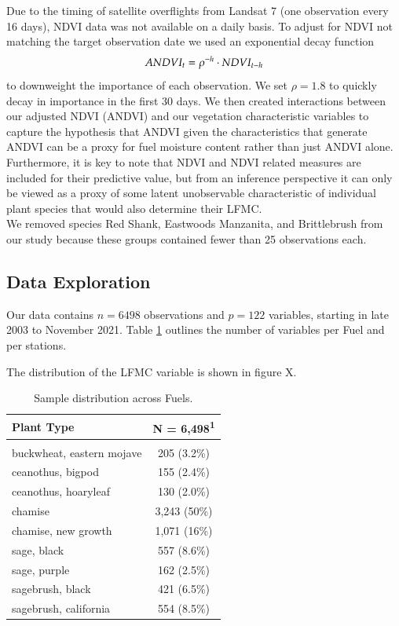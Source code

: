 \documentclass[twocolumn,10pt]{article}
\begin{document}
Due to the timing of satellite overflights from Landsat 7 (one observation every 16 days), NDVI data was not available on a daily basis. To adjust for NDVI not matching the target observation date we used an exponential decay function
\begin{equation}
    \label{eqn:downweight}
    ANDVI_{t} = \rho^{-h} \cdot NDVI_{t-h}\\
\end{equation}
to downweight the importance of each observation. We set $\rho=1.8$ to quickly decay in importance in the first 30 days. We then created interactions between our adjusted NDVI (ANDVI) and our vegetation characteristic variables to capture the hypothesis that ANDVI given the characteristics that generate ANDVI can be a proxy for fuel moisture content rather than just ANDVI alone.
Furthermore, it is key to note that NDVI and NDVI related measures are included for their predictive value, but from an inference perspective it can only be viewed as a proxy of some latent unobservable characteristic of individual plant species that would also determine their LFMC.\\

We removed species Red Shank, Eastwoods Manzanita, and Brittlebrush from our study because these groups contained fewer than 25 observations each. \\

\subsection{Data Exploration}%

Our data contains $n=6498$ observations and $p = 122$ variables, 
starting in late 2003 to November 2021.
Table \ref{tab:samp} outlines the number of variables per Fuel and per stations.

The distribution of the LFMC variable is shown in figure X.

\begin{table}{}
\centering
\begin{tabular}{l c}
\toprule
\textbf{Plant Type} & \textbf{N = 6,498}\textsuperscript{1} \\ 
\hline \\
buckwheat, eastern mojave & 205 (3.2\%) \\ 
ceanothus, bigpod & 155 (2.4\%) \\ 
ceanothus, hoaryleaf & 130 (2.0\%) \\ 
chamise & 3,243 (50\%) \\ 
chamise, new growth & 1,071 (16\%) \\ 
sage, black & 557 (8.6\%) \\ 
sage, purple & 162 (2.5\%) \\ 
sagebrush, black & 421 (6.5\%) \\ 
sagebrush, california & 554 (8.5\%) \\ 
 \bottomrule
\end{tabular}
\caption{Sample distribution across Fuels.}
\label{tab:samp}
\end{table}
\end{document}
